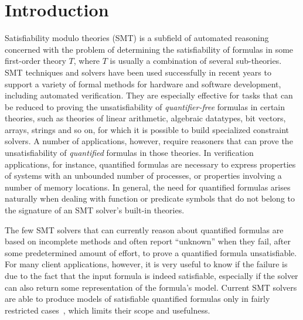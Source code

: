\documentclass{svjour3}                     %
\begin{document}
\section{Introduction} \label{sec:intro}

Satisfiability modulo theories (SMT) is a subfield of automated reasoning
concerned with the problem of determining the satisfiability of formulas 
in some first-order theory $T$,
where $T$ is usually a combination of several sub-theories. 
SMT techniques and solvers have been used successfully in recent years to support 
a variety of formal methods for hardware and software development,
including automated verification.
They are especially effective for tasks that can be reduced 
to proving the unsatisfiability of \emph{quantifier-free} formulas 
in certain theories, such as theories of linear arithmetic, algebraic datatypes,
bit vectors, arrays, strings and so on, for which it is possible to build
specialized constraint solvers.
A number of applications, however, require reasoners that can prove the 
unsatisfiability of \emph{quantified} formulas in those theories.
In verification applications, for instance, quantified formulas are necessary 
to express properties of systems with an unbounded number of processes, 
or properties involving a number of memory locations.
In general, the need for quantified formulas arises naturally 
when dealing with function or predicate symbols that do not
belong to the signature of an SMT solver's built-in theories.


The few SMT solvers that can currently reason about quantified formulas are based 
on incomplete methods and often report ``unknown'' when they fail, 
after some predetermined amount of effort, 
to prove a quantified formula unsatisfiable.
For many client applications, however, it is very useful to know 
if the failure is due to the fact that the input formula is indeed satisfiable,
especially if the solver can also return some representation 
of the formula's model.
Current SMT solvers are able to produce models of satisfiable quantified formulas
only in fairly restricted cases~\cite{GeDeM-CAV-09}, 
which limits their scope and usefulness.
\end{document}
